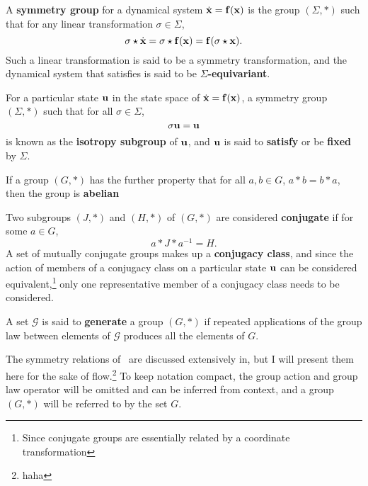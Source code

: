 \begin{define}\label{def:equivariance}
A {\bf symmetry group} for a dynamical system $\dot{\mathbf{x}} = \mathbf{f}(\mathbf{x})$  is the group $(\Sigma,\ast)$ such that for any linear transformation $\sigma \in \Sigma$, 
\begin{equation}\label{eq:kitty}
\sigma\star \dot{\mathbf{x}} = \sigma\star \mathbf{f}(\mathbf{x}) = \mathbf{f}(\sigma \star \mathbf{x}).
\end{equation}
Such a linear transformation is said to be a symmetry transformation, and the dynamical system that satisfies  is said to be {\bf $\Sigma$-equivariant}.
\end{define}
\begin{define}
For a particular state $\mathbf{u}$ in the state space of $\dot{\mathbf{x}} = \mathbf{f}(\mathbf{x})$, a symmetry group $(\Sigma,\ast)$ such that for all $\sigma \in \Sigma$,
\begin{equation}
\sigma \mathbf{u}  = \mathbf{u}
\end{equation}
is known as the {\bf isotropy subgroup} of $\mathbf{u}$, and $\mathbf{u}$ is said to {\bf satisfy} or be {\bf fixed} by $\Sigma$. 
\end{define}
\begin{define}
If a group $(G,\ast)$ has the further property that for all $a,b \in G$, $a \ast b = b \ast a$, then the group is {\bf abelian}
\end{define}
\begin{define}\label{def:conjugacy}
Two subgroups $(J,\ast)$ and $(H,\ast)$ of $(G,\ast)$ are considered {\bf conjugate} if for some $a \in G$,
\begin{equation}
a\ast J \ast a^{-1} = H.
\end{equation} 
A set of mutually conjugate groups makes up a {\bf conjugacy class}, and since the action of members of a conjugacy class on a particular state $\mathbf{u}$ can be considered equivalent,\footnote{Since conjugate groups are essentially related by a coordinate transformation} only one representative member of a conjugacy class needs to be considered. 
\end{define}
\begin{define}
A set $\mathcal{G}$ is said to {\bf generate} a group $(G,\ast)$ if repeated applications of the group law between elements of $\mathcal{G}$ produces all the elements of $G$.
\end{define}
The symmetry relations of \pCf\ are discussed extensively in, but I will present them here for the sake of flow.\footnote{haha} To keep notation compact, the group action and group law operator will be omitted and can be inferred from context, and a group $(G,\ast)$ will be referred to by the set $G$. 
